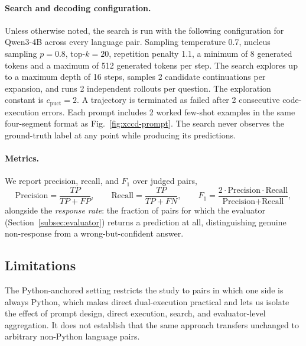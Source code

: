 \paragraph{Search and decoding configuration.} Unless otherwise noted, the
search is run with the following configuration for Qwen3-4B across every
language pair. Sampling temperature 0.7, nucleus sampling $p=0.8$, top-$k=20$,
repetition penalty 1.1, a minimum of 8 generated tokens and a maximum of 512
generated tokens per step. The search explores up to a maximum depth of 16
steps, samples 2 candidate continuations per expansion, and runs 2 independent
rollouts per question. The exploration constant is $c_{\text{puct}}=2$. A
trajectory is terminated as failed after 2 consecutive code-execution errors.
Each prompt includes 2 worked few-shot examples in the same four-segment
format as Fig.~\ref{fig:xccd-prompt}. The search never observes the
ground-truth label at any point while producing its predictions.

\paragraph{Metrics.} We report precision, recall, and $F_1$ over judged
pairs,
\[
    \text{Precision} = \frac{TP}{TP+FP}, \qquad
    \text{Recall} = \frac{TP}{TP+FN}, \qquad
    F_1 = \frac{2\cdot\text{Precision}\cdot\text{Recall}}{\text{Precision}+\text{Recall}},
\]
alongside the \emph{response rate}: the fraction of pairs for which the
evaluator (Section~\ref{subsec:evaluator}) returns a prediction at all,
distinguishing genuine non-response from a wrong-but-confident answer.

\subsection{Limitations}
\label{subsec:limitations}

The Python-anchored setting restricts the study to pairs in which one side is
always Python, which makes direct dual-execution practical and lets us
isolate the effect of prompt design, direct execution, search, and
evaluator-level aggregation. It does not establish that the same approach
transfers unchanged to arbitrary non-Python language pairs.

